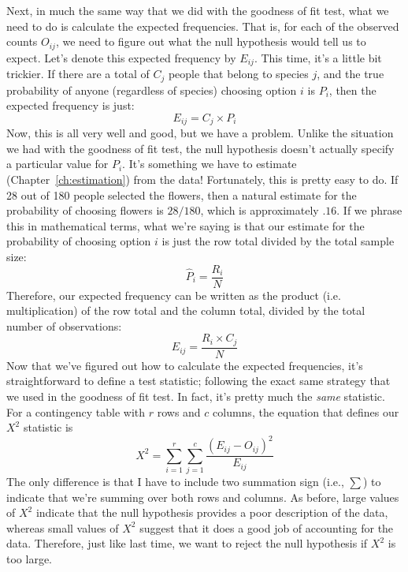 Next, in much the same way that we did with the goodness of fit test, what we need to do is calculate the expected frequencies. That is, for each of the observed counts $O_{ij}$, we need to figure out what the null hypothesis would tell us to expect. Let's denote this expected frequency by $E_{ij}$. This time, it's a little bit trickier. If there are a total of $C_j$ people that belong to species $j$, and the true probability of anyone (regardless of species) choosing option $i$ is $P_i$, then the expected frequency is just: 
$$
E_{ij} = C_j \times P_i
$$
Now, this is all very well and good, but we have a problem. Unlike the situation we had with the goodness of fit test, the null hypothesis doesn't actually specify a particular value for $P_i$. It's something we have to estimate (Chapter~\ref{ch:estimation}) from the data! Fortunately, this is pretty easy to do. If 28 out of 180 people selected the flowers, then a natural estimate for the probability of choosing flowers is $28/180$, which is approximately $.16$. If we phrase this in mathematical terms, what we're saying is that our estimate for the probability of choosing option $i$ is just the row total divided by the total sample size:
$$
\hat{P}_i = \frac{R_i}{N}
$$ 
Therefore, our expected frequency can be written as the product (i.e. multiplication) of the row total and the column total, divided by the total number of observations:
$$
E_{ij} = \frac{R_i \times C_j}{N}
$$
Now that we've figured out how to calculate the expected frequencies, it's straightforward to define a test statistic; following the exact same strategy that we used in the goodness of fit test. In fact, it's pretty much the {\it same} statistic. For a contingency table with $r$ rows and $c$ columns, the equation that defines our $X^2$ statistic is 
$$ 
X^2 = \sum_{i=1}^r\sum_{j=1}^c \frac{({E}_{ij} - O_{ij})^2}{{E}_{ij}}
$$
The only difference is that I have to include two summation sign (i.e., $\sum$) to indicate that we're summing over both rows and columns. As before, large values of $X^2$ indicate that the null hypothesis provides a poor description of the data, whereas small values of $X^2$ suggest that it does a good job of accounting for the data. Therefore, just like last time, we want to reject the null hypothesis if $X^2$ is too large.

